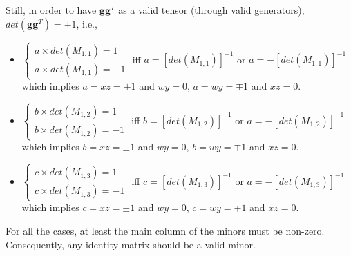 \begin{otherlanguage}{english}
Still, in order to have $\mathbf{gg}^{T}$ as a valid tensor (through valid generators), $det(\mathbf{gg}^{T}) = \pm 1$, i.e.,
\begin{itemize}
\item 
$
\begin{cases}
a \times det(M_{1,1}) = 1 \\
a \times det(M_{1,1}) = -1
\end{cases}
$
iff $a = [det(M_{1,1})]^{-1}$ or $a = -[det(M_{1,1})]^{-1}$ which implies $a = xz = \pm 1$ and $wy = 0$, $a = wy = \mp 1$ and $xz = 0$.
\item
$
\begin{cases}
b \times det(M_{1,2}) = 1 \\
b \times det(M_{1,2}) = -1
\end{cases}
$
iff $b = [det(M_{1,2})]^{-1}$ or $a = -[det(M_{1,2})]^{-1}$ which implies $b = xz = \pm 1$ and $wy = 0$, $b = wy = \mp 1$ and $xz = 0$.
\item
$
\begin{cases}
c \times det(M_{1,3}) = 1 \\
c \times det(M_{1,3}) = -1
\end{cases}
$
iff $c = [det(M_{1,3})]^{-1}$ or $a = -[det(M_{1,3})]^{-1}$ which implies $c = xz = \pm 1$ and $wy = 0$, $c = wy = \mp 1$ and $xz = 0$.
\end{itemize}

For all the cases, at least the main column of the minors must be non-zero. Consequently, any identity matrix should be a valid minor.

\end{otherlanguage}